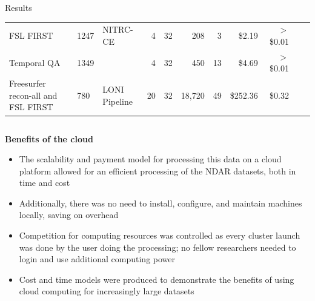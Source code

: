 \documentclass[final,hyperref={pdfpagelabels=false}]{beamer}
\begin{document}
\begin{frame}
\begin{columns}
\begin{column}{.5\textwidth}
{\begin{block}{Results}
\begin{center}
\begin{table}
\begin{tabularx}{\textwidth}{XXlrl*{6}{r}}
                        FSL FIRST & 1247 & NITRC-CE & 4 & 32 & 208 & 3 & \$2.19 & $>$ \$0.01\\
                        Temporal QA & 1349 &  & 4 & 32 & 450 & 13 & \$4.69 & $>$ \$0.01\\
                        \hline
                        Freesurfer recon-all and FSL FIRST & 780 & LONI Pipeline & 20 & 32 & 18,720 & 49 & \$252.36 & \$0.32\\
                    \end{tabularx}
                \end{table}
            \end{center}
          \begin{column}{.47\textwidth}
              {\bf Benefits of the cloud}
              \begin{itemize}
                  \item The scalability and payment model for processing this data on a cloud platform allowed for an efficient processing of the NDAR datasets, both in time and cost
                  \item Additionally, there was no need to install, configure, and maintain machines locally, saving on overhead
                  \item Competition for computing resources was controlled as every cluster launch was done by the user doing the processing; no fellow researchers needed to login and use additional computing power
                  \item Cost and time models were produced to demonstrate the benefits of using cloud computing for increasingly large datasets
              \end{itemize}
              \begin{figure}

\end{figure}
\end{column}
\end{block}}
\end{column}
\end{columns}
\end{frame}
\end{document}
